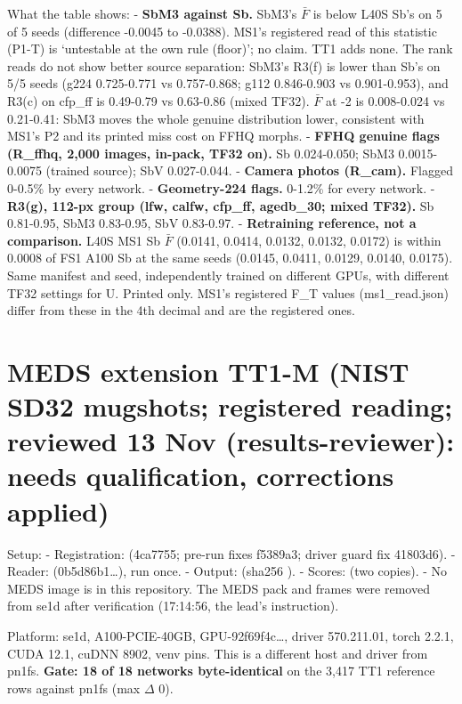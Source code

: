 \documentclass[10pt,twocolumn,letterpaper]{article}
\begin{document}
What the table shows: - \textbf{SbM3 against Sb.} SbM3's \(\bar F\) is below L40S Sb's on 5 of 5 seeds (difference -0.0045 to -0.0388). MS1's registered read of this statistic (P1-T) is `untestable at the own rule (floor)'; no claim. TT1 adds none. The rank reads do not show better source separation: SbM3's R3(f) is lower than Sb's on 5/5 seeds (g224 0.725-0.771 vs 0.757-0.868; g112 0.846-0.903 vs 0.901-0.953), and R3(c) on cfp\_ff is 0.49-0.79 vs 0.63-0.86 (mixed TF32). \(\bar F\) at -2 is 0.008-0.024 vs 0.21-0.41: SbM3 moves the whole genuine distribution lower, consistent with MS1's P2 and its printed miss cost on FFHQ morphs. - \textbf{FFHQ genuine flags (R\_ffhq, 2,000 images, in-pack, TF32 on).} Sb 0.024-0.050; SbM3 0.0015-0.0075 (trained source); SbV 0.027-0.044. - \textbf{Camera photos (R\_cam).} Flagged 0-0.5\% by every network. - \textbf{Geometry-224 flags.} 0-1.2\% for every network. - \textbf{R3(g), 112-px group (lfw, calfw, cfp\_ff, agedb\_30; mixed TF32).} Sb 0.81-0.95, SbM3 0.83-0.95, SbV 0.83-0.97. - \textbf{Retraining reference, not a comparison.} L40S MS1 Sb \(\bar F\) (0.0141, 0.0414, 0.0132, 0.0132, 0.0172) is within 0.0008 of FS1 A100 Sb at the same seeds (0.0145, 0.0411, 0.0129, 0.0140, 0.0175). Same manifest and seed, independently trained on different GPUs, with different TF32 settings for U. Printed only. MS1's registered F\_T values (ms1\_read.json) differ from these in the 4th decimal and are the registered ones.

\section{MEDS extension TT1-M (NIST SD32 mugshots; registered reading; reviewed 13 Nov (results-reviewer): needs qualification, corrections applied)}\label{meds-extension-tt1-m-nist-sd32-mugshots-registered-reading-reviewed-13-nov-results-reviewer-needs-qualification-corrections-applied}

Setup: - Registration: \protect{} (4ca7755; pre-run fixes f5389a3; driver guard fix 41803d6). - Reader: \protect{} (0b5d86b1\ldots{}), run once. - Output: \protect{} (sha256 \protect{}). - Scores: \protect{} (two copies). - No MEDS image is in this repository. The MEDS pack and frames were removed from se1d after verification (17:14:56, the lead's instruction).

Platform: se1d, A100-PCIE-40GB, GPU-92f69f4c\ldots{}, driver 570.211.01, torch 2.2.1, CUDA 12.1, cuDNN 8902, venv pins. This is a different host and driver from pn1fs. \textbf{Gate: 18 of 18 networks byte-identical} on the 3,417 TT1 reference rows against pn1fs (max \textbar{}\(\Delta\)\textbar{} 0).
\end{document}
